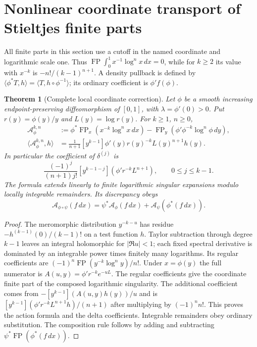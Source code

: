 \providecommand{\NLFP}{\operatorname{FP}}
\providecommand{\NLLi}{\operatorname{Li}}
\providecommand{\NLA}{\mathcal A}
\providecommand{\NLT}{\mathcal T}
\newtheorem{nonlinearthm}{Theorem}[section]

\section{Nonlinear coordinate transport of Stieltjes finite parts}
\label{nonlinear:sec:transport}
All finite parts in this section use a cutoff in the named coordinate and
logarithmic scale one. Thus $\NLFP\int_0^1x^{-1}\log^n x\,dx=0$, while for
$k\ge2$ its value with $x^{-k}$ is $-n!/(k-1)^{n+1}$.
A density pullback is defined by
$\langle\phi^*T,h\rangle=\langle T,h\circ\phi^{-1}\rangle$;
its ordinary coefficient is $\phi'f(\phi)$.

\begin{nonlinearthm}[Complete local coordinate correction]
\label{nonlinear:thm:local}
Let $\phi$ be a smooth increasing endpoint-preserving diffeomorphism of
$[0,1]$, with $\lambda=\phi'(0)>0$. Put $r(y)=\phi(y)/y$ and
$L(y)=\log r(y)$. For $k\ge1$, $n\ge0$,
\begin{align*}
\NLA_\phi^{k,n}
&:=\phi^*\NLFP_x(x^{-k}\log^n x\,dx)
-\NLFP_y(\phi'\phi^{-k}\log^n\phi\,dy),\\
\langle\NLA_\phi^{k,n},h\rangle
&=\frac1{n+1}[y^{k-1}]\phi'(y)r(y)^{-k}L(y)^{n+1}h(y).
\end{align*}
In particular the coefficient of $\delta^{(j)}$ is
\[
\frac{(-1)^j}{(n+1)j!}[y^{k-1-j}](\phi'r^{-k}L^{n+1}),
\qquad 0\le j\le k-1.
\]
The formula extends linearly to finite logarithmic singular expansions
modulo locally integrable remainders. Its discrepancy obeys
\[
\NLA_{\phi\circ\psi}(f\,dx)
=\psi^*\NLA_\phi(f\,dx)+\NLA_\psi(\phi^*(f\,dx)).
\]
\end{nonlinearthm}
\begin{proof}
The meromorphic distribution $y^{-k-u}$ has residue
$-h^{(k-1)}(0)/(k-1)!$ on a test function $h$. Taylor subtraction through
degree $k-1$ leaves an integral holomorphic for $|\Re u|<1$; each fixed
spectral derivative is dominated by an integrable power times finitely
many logarithms. Its regular coefficients are
$(-1)^n\NLFP(y^{-k}\log^n y)/n!$.
Under $x=\phi(y)$ the full numerator is
$A(u,y)=\phi'r^{-k}e^{-uL}$.
The regular coefficients give the coordinate finite part of the composed
logarithmic singularity. The additional coefficient comes from
$-[y^{k-1}](A(u,y)h(y))/u$ and is
$[y^{k-1}](\phi'r^{-k}L^{n+1}h)/(n+1)$ after multiplying by $(-1)^nn!$.
This proves the action formula and the delta coefficients. Integrable
remainders obey ordinary substitution. The composition rule follows by
adding and subtracting $\psi^*\NLFP(\phi^*(f\,dx))$.
\end{proof}

